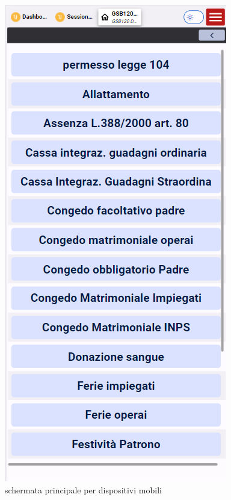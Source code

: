 \documentclass[target=bach,aauheader=,style=]{thud}
\begin{document}
\begin{figure}[H]
\begin{minipage}{0.25\textwidth}
        \caption{schermata principale per dispositivi mobili}
    \end{minipage}
    \hfill
    \begin{minipage}{0.25\textwidth}
        \centering
        \includegraphics[width=\linewidth]{screenshot/Mobile GSA082.png}

\end{minipage}
\end{figure}
\end{document}

